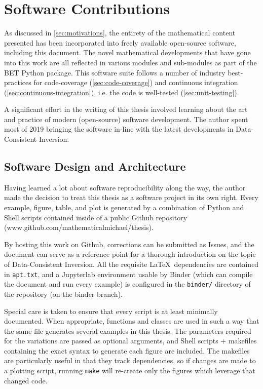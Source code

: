 \section{Software Contributions}\label{sec:software-contributions}

As discussed in \ref{sec:motivations}, the entirety of the mathematical content presented has been incorporated into freely available open-source software, including this document.
The novel mathematical developments that have gone into this work are all reflected in various modules and sub-modules as part of the BET Python package.
This software suite follows a number of industry best-practices for code-coverage (\ref{sec:code-coverage}) and continuous integration (\ref{sec:continuous-integration}), i.e. the code is well-tested (\ref{sec:unit-testing}).

A significant effort in the writing of this thesis involved learning about the art and practice of modern (open-source) software development.
The author spent most of 2019 bringing the software in-line with the latest developments in Data-Consistent Inversion.



\subsection{Software Design and Architecture}\label{sec:architecture}

Having learned a lot about software reproducibility along the way, the author made the decision to treat this thesis as a software project in its own right.
Every example, figure, table, and plot is generated by a combination of Python and Shell scripts contained inside of a public Github repository (www.github.com/mathematicalmichael/thesis).

By hosting this work on Github, corrections can be submitted as Issues, and the document can serve as a reference point for a thorough introduction on the topic of Data-Consistent Inversion.
All the requisite \LaTeX~dependencies are contained in {\tt apt.txt}, and a Jupyterlab environment usable by Binder (which can compile the document and run every example) is configured in the {\tt binder/} directory of the repository (on the binder branch).

Special care is taken to ensure that every script is at least minimally documented.
When appropriate, functions and classes are used in such a way that the same file generates several examples in this thesis.
The parameters required for the variations are passed as optional arguments, and Shell scripts + makefiles containing the exact syntax to generate each figure are included.
The makefiles are particularly useful in that they track dependencies, so if changes are made to a plotting script, running {\tt make} will re-create only the figures which leverage that changed code.


